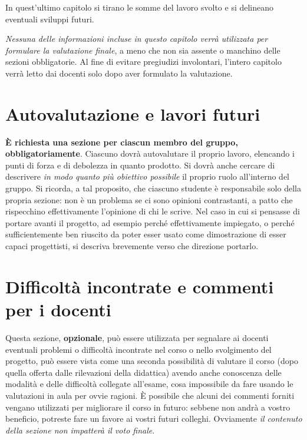 \documentclass[a4paper,12pt]{report}
\begin{document}
In quest'ultimo capitolo si tirano le somme del lavoro svolto e si delineano eventuali sviluppi 
futuri.

\textit{Nessuna delle informazioni incluse in questo capitolo verrà utilizzata per formulare la valutazione finale}, a meno che non sia assente o manchino delle sezioni obbligatorie.
%
Al fine di evitare pregiudizi involontari, l'intero capitolo verrà letto dai docenti solo dopo aver formulato la valutazione.

\section{Autovalutazione e lavori futuri}

\textbf{È richiesta una sezione per ciascun membro del gruppo, obbligatoriamente}.
%
Ciascuno dovrà autovalutare il proprio lavoro, elencando i punti di forza e di debolezza in quanto prodotto.
Si dovrà anche cercare di descrivere \emph{in modo quanto più obiettivo possibile} il proprio ruolo all'interno del gruppo.
Si ricorda, a tal proposito, che ciascuno studente è responsabile solo della propria sezione: non è un problema se ci sono opinioni contrastanti, a patto che rispecchino effettivamente l'opinione di chi le scrive.
Nel caso in cui si pensasse di portare avanti il progetto, ad esempio perché effettivamente impiegato, o perché sufficientemente ben riuscito da poter esser usato come dimostrazione di esser capaci progettisti, si descriva brevemente verso che direzione portarlo.

\section{Difficoltà incontrate e commenti per i docenti}

Questa sezione, \textbf{opzionale}, può essere utilizzata per segnalare ai docenti eventuali problemi o difficoltà incontrate nel corso o nello svolgimento del progetto, può essere vista come una seconda possibilità di valutare il corso (dopo quella offerta dalle rilevazioni della didattica) avendo anche conoscenza delle modalità e delle difficoltà collegate all'esame, cosa impossibile da fare usando le valutazioni in aula per ovvie ragioni.
%
È possibile che alcuni dei commenti forniti vengano utilizzati per migliorare il corso in futuro: sebbene non andrà a vostro beneficio, potreste fare un favore ai vostri futuri colleghi.
%
Ovviamente \textit{il contenuto della sezione non impatterà il voto finale}.

\appendix
\end{document}
